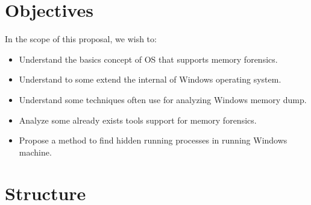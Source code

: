 \section[Objectives]{Objectives}

In the scope of this proposal, we wish to:

\begin{itemize}
  \item Understand the basics concept of OS that supports memory forensics.
  \item Understand to some extend the internal of Windows operating system.
  \item Understand some techniques often use for analyzing Windows memory dump.
  \item Analyze some already exists tools support for memory forensics.
  \item Propose a method to find hidden running processes in running Windows machine.
\end{itemize}

\section[Structure]{Structure}

